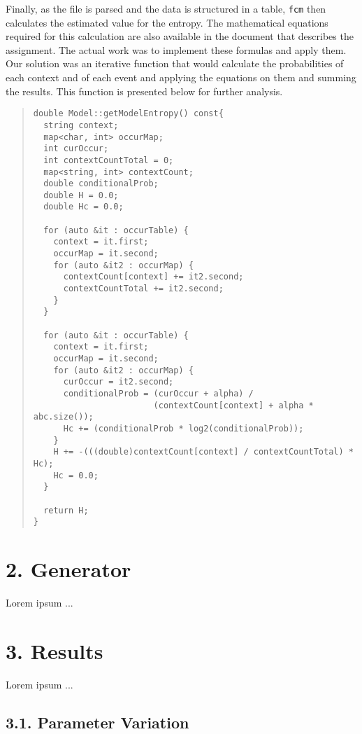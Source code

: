 \documentclass[12pt]{article}
\begin{document}
Finally, as the file is parsed and the data is structured in a table,
\texttt{fcm} then calculates the estimated value for the entropy.
The mathematical equations required for this calculation are also 
available in the document that describes the assignment. 
The actual work was to implement these formulas and apply them.
Our solution was an iterative function that would calculate the probabilities
of each context and of each event and applying the equations on them and 
summing the results. 
This function is presented below for further analysis.

\begingroup
\addtolength\leftmargini{-0.4in}
\addtolength\baselineskip{-0.05in}
\begin{quote}
\begin{verbatim}
double Model::getModelEntropy() const{
  string context;
  map<char, int> occurMap;
  int curOccur;
  int contextCountTotal = 0;
  map<string, int> contextCount;
  double conditionalProb;
  double H = 0.0;
  double Hc = 0.0;

  for (auto &it : occurTable) {
    context = it.first;
    occurMap = it.second;
    for (auto &it2 : occurMap) {
      contextCount[context] += it2.second;
      contextCountTotal += it2.second;
    }
  }

  for (auto &it : occurTable) {
    context = it.first;
    occurMap = it.second;
    for (auto &it2 : occurMap) {
      curOccur = it2.second;
      conditionalProb = (curOccur + alpha) /
                        (contextCount[context] + alpha * abc.size());
      Hc += (conditionalProb * log2(conditionalProb));
    }
    H += -(((double)contextCount[context] / contextCountTotal) * Hc);
    Hc = 0.0;
  }

  return H;
}
\end{verbatim}
\end{quote}
\endgroup
\newpage

\section*{2. Generator}

Lorem ipsum ...

\section*{3. Results}

Lorem ipsum ...

\subsection*{3.1. Parameter Variation}
\end{document}
